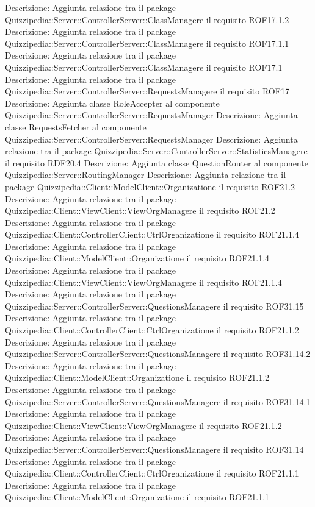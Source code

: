 Descrizione: Aggiunta relazione tra il package Quizzipedia::Server::ControllerServer::ClassManagere il requisito ROF17.1.2 
Descrizione: Aggiunta relazione tra il package Quizzipedia::Server::ControllerServer::ClassManagere il requisito ROF17.1.1 
Descrizione: Aggiunta relazione tra il package Quizzipedia::Server::ControllerServer::ClassManagere il requisito ROF17.1 
Descrizione: Aggiunta relazione tra il package Quizzipedia::Server::ControllerServer::RequestsManagere il requisito ROF17 
Descrizione: Aggiunta classe RoleAccepter al componente Quizzipedia::Server::ControllerServer::RequestsManager 
Descrizione: Aggiunta classe RequestsFetcher al componente Quizzipedia::Server::ControllerServer::RequestsManager 
Descrizione: Aggiunta relazione tra il package Quizzipedia::Server::ControllerServer::StatisticsManagere il requisito RDF20.4 
Descrizione: Aggiunta classe QuestionRouter al componente Quizzipedia::Server::RoutingManager 
Descrizione: Aggiunta relazione tra il package Quizzipedia::Client::ModelClient::Organizatione il requisito ROF21.2 
Descrizione: Aggiunta relazione tra il package Quizzipedia::Client::ViewClient::ViewOrgManagere il requisito ROF21.2 
Descrizione: Aggiunta relazione tra il package Quizzipedia::Client::ControllerClient::CtrlOrganizatione il requisito ROF21.1.4 
Descrizione: Aggiunta relazione tra il package Quizzipedia::Client::ModelClient::Organizatione il requisito ROF21.1.4 
Descrizione: Aggiunta relazione tra il package Quizzipedia::Client::ViewClient::ViewOrgManagere il requisito ROF21.1.4 
Descrizione: Aggiunta relazione tra il package Quizzipedia::Server::ControllerServer::QuestionsManagere il requisito ROF31.15 
Descrizione: Aggiunta relazione tra il package Quizzipedia::Client::ControllerClient::CtrlOrganizatione il requisito ROF21.1.2 
Descrizione: Aggiunta relazione tra il package Quizzipedia::Server::ControllerServer::QuestionsManagere il requisito ROF31.14.2 
Descrizione: Aggiunta relazione tra il package Quizzipedia::Client::ModelClient::Organizatione il requisito ROF21.1.2 
Descrizione: Aggiunta relazione tra il package Quizzipedia::Server::ControllerServer::QuestionsManagere il requisito ROF31.14.1 
Descrizione: Aggiunta relazione tra il package Quizzipedia::Client::ViewClient::ViewOrgManagere il requisito ROF21.1.2 
Descrizione: Aggiunta relazione tra il package Quizzipedia::Server::ControllerServer::QuestionsManagere il requisito ROF31.14 
Descrizione: Aggiunta relazione tra il package Quizzipedia::Client::ControllerClient::CtrlOrganizatione il requisito ROF21.1.1 
Descrizione: Aggiunta relazione tra il package Quizzipedia::Client::ModelClient::Organizatione il requisito ROF21.1.1 
